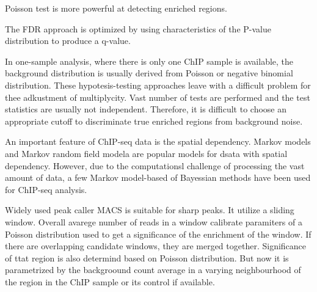 Poisson test is more powerful at detecting enriched regions.\cite{}




The FDR approach is optimized by using characteristics of the P-value distribution to produce a q-value.


In one-sample analysis, where there is only one ChIP sample is available, the background distribution is usually derived from Poisson or negative binomial distribution.
These hypotesis-testing approaches leave with a difficult problem for thee adkustment of multiplycity.
Vast number of tests are performed and the test statistics are usually not independent.
Therefore, it is difficult to choose an appropriate cutoff to discriminate true enriched regions from background noise.

An important feature of ChIP-seq data is the spatial dependency.
Markov models and Markov random field modela are popular models for dsata with spatial dependency.
However, due to the computationsl challenge of processing the vast amount of data, a few Markov model-based of Bayessian methods have been used for ChIP-seq analysis.



Widely used peak caller MACS is suitable for sharp peaks.
It utilize a sliding window. 
Overall avarege number of reads in a window calibrate paramiters of a Poisson distribution used to get a significance of the enrichment of the window.
If there are overlapping candidate windows, they are merged together.
Significance of ttat region is also determind based on Poisson distribution.
But now it is parametrized by the backgroound count average in a varying neighbourhood of the region in the ChIP sample or its control if available.





